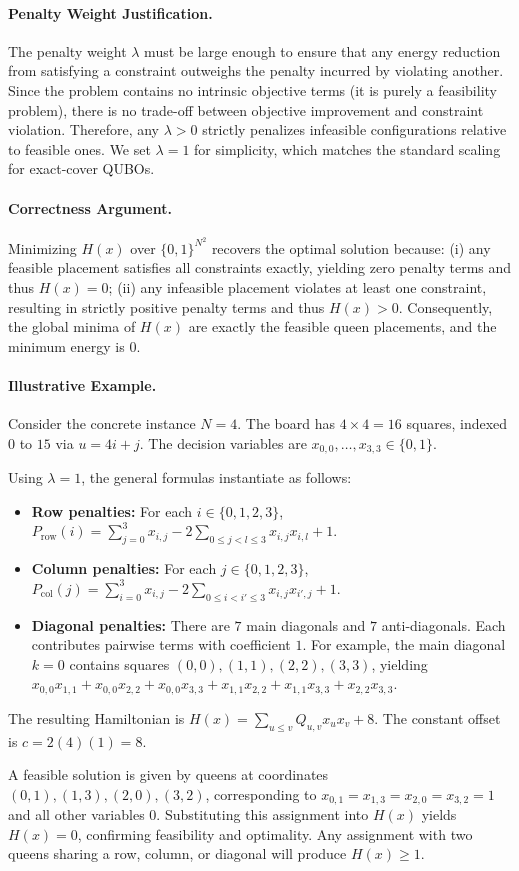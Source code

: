 \documentclass[12pt]{article}
\begin{document}
\paragraph{Penalty Weight Justification.}
The penalty weight $\lambda$ must be large enough to ensure that any energy reduction from satisfying a constraint outweighs the penalty incurred by violating another. Since the problem contains no intrinsic objective terms (it is purely a feasibility problem), there is no trade-off between objective improvement and constraint violation. Therefore, any $\lambda > 0$ strictly penalizes infeasible configurations relative to feasible ones. We set $\lambda = 1$ for simplicity, which matches the standard scaling for exact-cover QUBOs.

\paragraph{Correctness Argument.}
Minimizing $H(x)$ over $\{0,1\}^{N^2}$ recovers the optimal solution because: (i) any feasible placement satisfies all constraints exactly, yielding zero penalty terms and thus $H(x) = 0$; (ii) any infeasible placement violates at least one constraint, resulting in strictly positive penalty terms and thus $H(x) > 0$. Consequently, the global minima of $H(x)$ are exactly the feasible queen placements, and the minimum energy is $0$.

\paragraph{Illustrative Example.}
Consider the concrete instance $N=4$. The board has $4 \times 4 = 16$ squares, indexed $0$ to $15$ via $u = 4i + j$. The decision variables are $x_{0,0}, \dots, x_{3,3} \in \{0,1\}$.

Using $\lambda = 1$, the general formulas instantiate as follows:
\begin{itemize}
    \item \textbf{Row penalties:} For each $i \in \{0,1,2,3\}$, $P_{\text{row}}(i) = \sum_{j=0}^{3} x_{i,j} - 2\sum_{0 \le j < l \le 3} x_{i,j}x_{i,l} + 1$.
    \item \textbf{Column penalties:} For each $j \in \{0,1,2,3\}$, $P_{\text{col}}(j) = \sum_{i=0}^{3} x_{i,j} - 2\sum_{0 \le i < i' \le 3} x_{i,j}x_{i',j} + 1$.
    \item \textbf{Diagonal penalties:} There are $7$ main diagonals and $7$ anti-diagonals. Each contributes pairwise terms with coefficient $1$. For example, the main diagonal $k=0$ contains squares $(0,0), (1,1), (2,2), (3,3)$, yielding $x_{0,0}x_{1,1} + x_{0,0}x_{2,2} + x_{0,0}x_{3,3} + x_{1,1}x_{2,2} + x_{1,1}x_{3,3} + x_{2,2}x_{3,3}$.
\end{itemize}

The resulting Hamiltonian is $H(x) = \sum_{u \le v} Q_{u,v} x_u x_v + 8$. The constant offset is $c = 2(4)(1) = 8$.

A feasible solution is given by queens at coordinates $(0,1), (1,3), (2,0), (3,2)$, corresponding to $x_{0,1}=x_{1,3}=x_{2,0}=x_{3,2}=1$ and all other variables $0$. Substituting this assignment into $H(x)$ yields $H(x) = 0$, confirming feasibility and optimality. Any assignment with two queens sharing a row, column, or diagonal will produce $H(x) \ge 1$.
\end{document}
